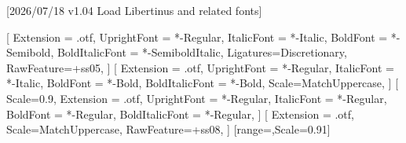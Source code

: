 
[2026/07/18 v1.04 Load Libertinus and related fonts]

%
%
\ifpdftex
    \RequirePackage[T1]{fontenc}
    \RequirePackage[lf,t,semibold,ScaleTT=0.9]{libertinus} %
    \RequirePackage{bm}%
\else
    \RequirePackage[warnings-off={mathtools-colon,mathtools-overbracket},mathbf=sym]{unicode-math}
    \setmainfont{LibertinusSerif}[%
    	Extension = .otf,
    	UprightFont = *-Regular,
    	ItalicFont = *-Italic,
    	BoldFont = *-Semibold, 
    	BoldItalicFont = *-SemiboldItalic,
	    Ligatures=Discretionary,
    	RawFeature={+ss05},
    ]    
    \setsansfont{LibertinusSans}[%
    	Extension = .otf,
    	UprightFont = *-Regular,
    	ItalicFont = *-Italic,
    	BoldFont = *-Bold,
	    BoldItalicFont = *-Bold,%
    	Scale=MatchUppercase,
	]
    \setmonofont{LibertinusMono}[%
    	Scale=0.9,%
	    Extension = .otf,
    	UprightFont = *-Regular,
    	ItalicFont = *-Regular,%
    	BoldFont = *-Regular,%
	    BoldItalicFont = *-Regular,%
	] 
	\newfontfamily{}%
	\newfontfamily{}%
    [%
     	Extension = .otf,   
    	Scale=MatchUppercase,
    	RawFeature={+ss08},%
    	]
	[range=\nabla,Scale=0.91] %
	
    \newcommand*{\FRAC}[1]{{\addfontfeature{Fractions=On}#1}}%
\fi
